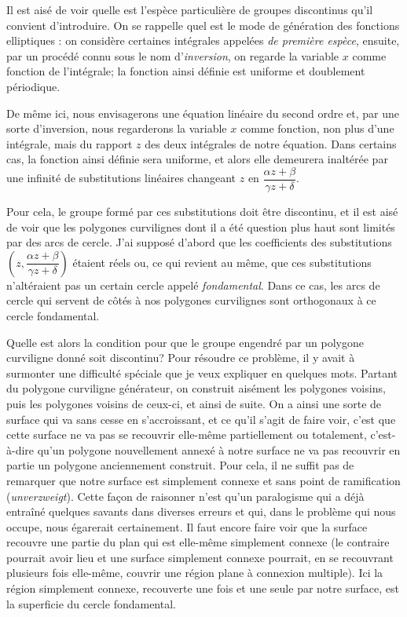 \documentclass[11pt]{article}
\begin{document}
Il est aisé de voir quelle est l’espèce particulière de groupes discontinus qu’il convient d’introduire. On se rappelle quel est le mode de génération des fonctions elliptiques : on considère certaines intégrales appelées \emph{de première espèce}, ensuite, par un procédé connu sous le nom d’\emph{inversion}, on regarde la variable $x$ comme fonction de l’intégrale; la fonction ainsi définie est uniforme et doublement périodique.

De même ici, nous envisagerons une équation linéaire du second ordre et, par une sorte d’inversion, nous regarderons la variable $x$ comme fonction, non plus d’une intégrale, mais du rapport $z$ des deux intégrales de notre équation. Dans certains cas, la fonction ainsi définie sera uniforme, et alors elle demeurera inaltérée par une infinité de substitutions linéaires changeant $z$ en $\dfrac{\alpha z+\beta}{\gamma z+\delta}$.

Pour cela, le groupe formé par ces substitutions doit être discontinu, et il est aisé de voir que les polygones curvilignes dont il a été question plus haut sont limités par des arcs de cercle. J’ai supposé d’abord que les coefficients des substitutions $\left(z,\dfrac{\alpha z+\beta}{\gamma z+\delta}\right)$ étaient réels ou, ce qui revient au même, que ces substitutions n’altéraient pas un certain cercle appelé \emph{fondamental}. Dans ce cas, les arcs de cercle qui servent de côtés à nos polygones curvilignes sont orthogonaux à ce cercle fondamental.

Quelle est alors la condition pour que le groupe engendré par un polygone curviligne donné soit discontinu? Pour résoudre ce problème, il y avait à surmonter une difficulté spéciale que je veux expliquer en quelques mots. Partant du polygone curviligne générateur, on construit aisément les polygones voisins, puis les polygones voisins de ceux-ci, et ainsi de suite. On a ainsi une sorte de surface qui va sans cesse en s’accroissant, et ce qu’il s’agit de faire voir, c’est que cette surface ne va pas se recouvrir elle-même partiellement ou totalement, c’est-à-dire qu’un polygone nouvellement annexé à notre surface ne va pas recouvrir en partie un polygone anciennement construit. Pour cela, il ne suffit pas de remarquer que notre surface est simplement connexe et sans point de ramification (\emph{unverzweigt}). Cette façon de raisonner n’est qu’un paralogisme qui a déjà entraîné quelques savants dans diverses erreurs et qui, dans le problème qui nous occupe, nous égarerait certainement. Il faut encore faire voir que la surface recouvre une partie du plan qui est elle-même simplement connexe (le contraire pourrait avoir lieu et une surface simplement connexe pourrait, en se recouvrant plusieurs fois elle-même, couvrir une région plane à connexion multiple). Ici la région simplement connexe, recouverte une fois et une seule par notre surface, est la superficie du cercle fondamental.
\end{document}
